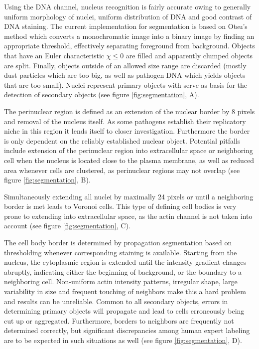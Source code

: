 \begin{description}[leftmargin=0.5cm]
\item[Nuclei:] Using the DNA channel, nucleus recognition is fairly accurate owing to generally uniform morphology of nuclei, uniform distribution of DNA and good contrast of DNA staining. The current implementation for segmentation is based on Otsu's method which converts a monochromatic image into a binary image by finding an appropriate threshold, effectively separating foreground from background. Objects that have an Euler characteristic $\chi \le 0$ are filled and apparently clumped objects are split. Finally, objects outside of an allowed size range are discarded (mostly dust particles which are too big, as well as pathogen DNA which yields objects that are too small). Nuclei represent primary objects with serve as basis for the detection of secondary objects (see figure \ref{fig:segmentation}, A).
\item[PeriNuclei:] The perinuclear region is defined as an extension of the nuclear border by 8 pixels and removal of the nucleus itself. As some pathogens establish their replicatory niche in this region it lends itself to closer investigation. Furthermore the border is only dependent on the reliably established nuclear object. Potential pitfalls include extension of the perinuclear region into extracellular space or neighboring cell when the nucleus is located close to the plasma membrane, as well as reduced area whenever cells are clustered, as perinuclear regions may not overlap (see figure \ref{fig:segmentation}, B).
\item[VoronoiCells:] Simultaneously extending all nuclei by maximally 24 pixels or until a neighboring border is met leads to Voronoi cells. This type of defining cell bodies is very prone to extending into extracellular space, as the actin channel is not taken into account (see figure \ref{fig:segmentation}, C).
\item[Cells:] The cell body border is determined by propagation segmentation based on thresholding whenever corresponding staining is available. Starting from the nucleus, the cytoplasmic region is extended until the intensity gradient changes abruptly, indicating either the beginning of background, or the boundary to a neighboring cell. Non-uniform actin intensity patterns, irregular shape, large variability in size and frequent touching of neighbors make this a hard problem and results can be unreliable. Common to all secondary objects, errors in determining primary objects will propagate and lead to cells erroneously being cut up or aggregated. Furthermore, borders to neighbors are frequently not determined correctly, but significant discrepancies among human expert labeling are to be expected in such situations as well (see figure \ref{fig:segmentation}, D).

\end{description}
